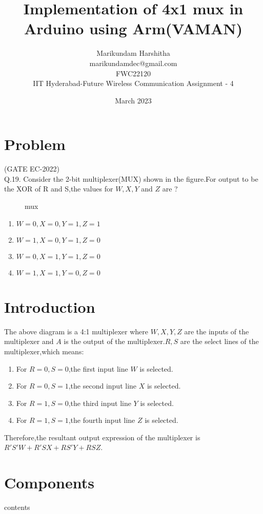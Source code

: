\documentclass[12pt]{article}
\title{Implementation of 4x1 mux in Arduino using Arm(VAMAN)}
\date{March 2023}
\author{Marikundam Harshitha\\marikundamdec@gmail.com\\FWC22120\\IIT Hyderabad-Future Wireless Communication Assignment - 4}
\begin{document}
\maketitle
\tableofcontents
\pagebreak

	 \section{Problem}
	 (GATE EC-2022)\\

Q.19. Consider the 2-bit multiplexer(MUX) shown in the figure.For output to be the XOR of R and S,the values for $ W,X,Y$ and $Z$ are ?\newline
\begin{figure}[h]

\caption{mux}
\label{fig:1}
\end{figure}
\begin{enumerate}
\item $W = 0, X = 0, Y = 1, Z = 1$
\item $W = 1, X = 0, Y = 1, Z = 0$
\item $W = 0, X = 1, Y = 1, Z = 0$
\item $W = 1, X = 1, Y = 0, Z = 0$
\end{enumerate}
\section{Introduction}
	The above diagram is a 4:1 multiplexer where $W, X, Y, Z$ are the inputs of the multiplexer and $A$ is the output of the multiplexer.$R , S$ are the select lines of the multiplexer,which means:\newline
\begin{enumerate}
\item For $R = 0,S = 0$,the first input line $W$ is selected.
\item For $R = 0,S = 1$,the second input line $X$ is selected.
\item For $R = 1,S = 0$,the third input line $Y$ is selected.
\item For $R = 1,S = 1$,the fourth input line $Z$ is selected.
\end{enumerate}
Therefore,the resultant output expression of the multiplexer is $R'S'W + R'SX + RS'Y + RSZ$.
\section{Components}
\begin{table}[h]
	
\caption{contents}
\label{table 1}
\end{table}
	\pagebreak
\end{document}
